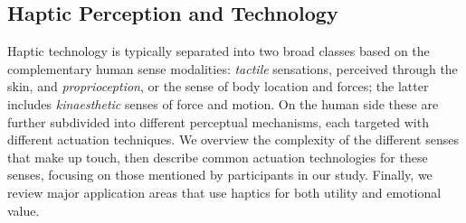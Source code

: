 \subsection{Haptic Perception and Technology} \noindent
Haptic technology is typically separated into two broad classes based on the complementary human sense modalities: \emph{tactile} sensations, perceived through the skin, and \emph{proprioception}, or the sense of body location and forces; the latter includes \emph{kinaesthetic} senses of force and motion. 
On the human side these are further subdivided into different perceptual mechanisms, each targeted with different actuation techniques.
We  overview the complexity of the different senses that make up touch,
 then describe common actuation technologies for these senses, focusing on those mentioned by participants in our study.
Finally, we review major application areas that use haptics for both utility and emotional value.




%


